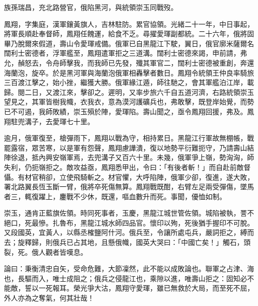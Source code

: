 \begin{pinyinscope}
族孫瑞昌，充北路營官，俄陷黑河，與統領崇玉同戰歿。

鳳翔，字集庭，漢軍鑲黃旗人，吉林駐防。累官協領。光緒二十一年，中日事起，將軍長順赴奉督師，鳳翔任餽運，給食不乏。尋擢愛琿副都統。二十六年，俄將固畢乃脫爾來假道，壽山令愛琿戒備。俄軍已自黑龍江下駛，翼日，俄官廓米薩爾名闊利士密德者，浮軍艦至，鳳翔遣軍拒之三道溝。闊利士密德來謁，申前請，弗允，赬怒去，令舟師擊我，而我師已先發，殲其軍官二，闊利士密德被重創，奔還海蘭泡，旋卒。於是黑河軍與海蘭泡俄軍相轟擊者數日。鳳翔令統領王仲良率騎旅三百渡江擊之，始小挫，繼獲大勝。俄軍緣江遁，師往馳之，會其軍艦泊江岸，載歸。閱二日，又渡江來，擊卻之。遲明，又率步旅六千自五道河濟，右路統領崇玉望見之，其軍皆樹我幟，衣我衣，意為漠河護礦兵也，弗敢擊，既登岸始覺，而勢已不可遏，我師敗績，崇玉殞於陣，愛琿陷。壽山聞之，亟令鳳翔回援，弗及。鳳翔駐兜溝子，去愛琿七十里。

逾月，俄軍復至，槍彈雨下，鳳翔以戰為守，相持累日。黑龍江行軍故無棚帳，戰罷露宿，眾苦寒，以是軍有怨聲，鳳翔慮譁潰，復以地勢平衍難扼守，乃請壽山結陣徐退，抵內興安嶺軍焉，去兜溝子又百六十里。未幾，俄軍爭上嶺，勢洶洶，師失利，仍扼嶺拒之。敵攻益亟，鳳翔悉甲出，令曰：「有後者斬！」而自赴前敵督懾。有材官稍卻，立使飛騎斬之。材官懼，大呼陷陣，俄軍少卻，復進，遂大敗，署北路翼長恆玉斷一臂，俄將卒死傷無算。鳳翔戰既酣，右臂左足兩受彈傷，墜馬者三，輒復躍上，鏖戰不少休，既還，嘔血數升而死。事聞，優恤如制。

崇玉，通肯正藍旗佐領。時同死事者，玉慶，黑龍江城世管佐領。城陷被執，詈不絕口，死最慘。扎魯布，黑龍江城水師四品官。懷印以殉，死後猶手握印不可脫。又段國英，宜黃人，以縣丞榷鹽阿什河。俄兵至，令讓所處屯兵，嚴詞拒之，縛而去；旋釋歸，則俄兵已占其地，且懸俄幟，國英大哭曰：「中國亡矣！」觸石，頭裂，死。俄人觀者皆嘆息。

論曰：秉衡清忠自矢，受命危難，大節凜然，此不能以成敗論也。聯軍之占津、海也，長驅而入，唯士成阻之；俄兵之侵龍江也，乘隙以進，唯壽山拒之：固知必不能敵，誓以一死報耳。榮光爭大沽，鳳翔守愛琿，雖已無救於大局，而至死不屈，外人亦為之奪氣，何其壯哉！


\end{pinyinscope}